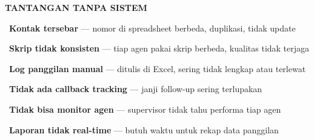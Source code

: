 \documentclass[a4paper]{article}
\begin{document}
\noindent
\begin{minipage}[t]{0.485\textwidth}
    \colorbox{RedLight}{%
        \begin{minipage}{\dimexpr\textwidth-2\fboxsep\relax}
            {\fontsize{10}{13}\selectfont\bfseries\color{RedText} TANTANGAN TANPA SISTEM}
        \end{minipage}}\par
    \vspace{4pt}

    {\fontsize{9.5}{13}\selectfont\color{TextDark}%
    \textbullet\ \textbf{Kontak tersebar} --- nomor di spreadsheet berbeda, duplikasi, tidak update\par\vspace{4pt}%
    \textbullet\ \textbf{Skrip tidak konsisten} --- tiap agen pakai skrip berbeda, kualitas tidak terjaga\par\vspace{4pt}%
    \textbullet\ \textbf{Log panggilan manual} --- ditulis di Excel, sering tidak lengkap atau terlewat\par\vspace{4pt}%
    \textbullet\ \textbf{Tidak ada callback tracking} --- janji follow-up sering terlupakan\par\vspace{4pt}%
    \textbullet\ \textbf{Tidak bisa monitor agen} --- supervisor tidak tahu performa tiap agen\par\vspace{4pt}%
    \textbullet\ \textbf{Laporan tidak real-time} --- butuh waktu untuk rekap data panggilan}%
\end{minipage}%
\hfill%
\end{document}
